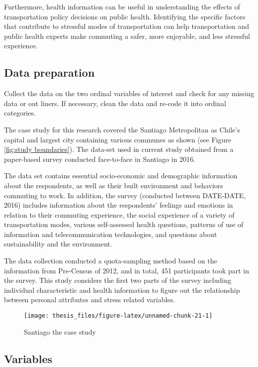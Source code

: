 \documentclass[
11pt, %
oneside, %
english, %
singlespacing, %
]{macthesis} %
\begin{document}
Furthermore, health information can be useful in understanding the effects of transportation policy decisions on public health. Identifying the specific factors that contribute to stressful modes of transportation can help transportation and public health experts make commuting a safer, more enjoyable, and less stressful experience.

\hypertarget{data-preparation}{%
\subsection{Data preparation}\label{data-preparation}}

Collect the data on the two ordinal variables of interest and check for any missing data or out liners. If necessary, clean the data and re-code it into ordinal categories.

The case study for this research covered the Santiago Metropolitan as Chile's capital and largest city containing various communes as shown (see Figure \ref{fig:study boundaries}). The data-set used in current study obtained from a paper-based survey conducted face-to-face in Santiago in 2016.

The data set contains essential socio-economic and demographic information about the respondents, as well as their built environment and behaviors commuting to work. In addition, the survey (conducted between DATE-DATE, 2016) includes information about the respondents' feelings and emotions in relation to their commuting experience, the social experience of a variety of transportation modes, various self-assessed health questions, patterns of use of information and telecommunication technologies, and questions about sustainability and the environment.

The data collection conducted a quota-sampling method based on the information from Pre-Census of 2012, and in total, 451 participants took part in the survey. This study considers the first two parts of the survey including individual characteristic and health information to figure out the relationship between personal attributes and stress related variables.
\begin{figure}

{\centering \texttt{[image: thesis\_files/figure-latex/unnamed-chunk-21-1]} 

}

\caption{\label{fig:study boundaries}Santiago the case study}\label{fig:unnamed-chunk-21}
\end{figure}
\hypertarget{variables}{%
\subsection{Variables}\label{variables}}
\end{document}
